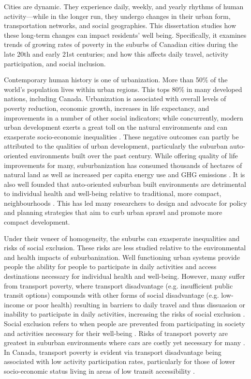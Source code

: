 
Cities are dynamic. They experience daily, weekly, and yearly rhythms of human activity---while in the longer run, they undergo changes in their urban form, transportation networks, and social geographies. This dissertation studies how these long-term changes can impact residents' well being. Specifically, it examines trends of growing rates of poverty in the suburbs of Canadian cities during the late 20th and early 21st centuries; and how this affects daily travel, activity participation, and social inclusion.


Contemporary human history is one of urbanization. More than 50\% of the world's population lives within urban regions. This tops 80\% in many developed nations, including Canada. Urbanization is associated with overall levels of poverty reduction, economic growth, increases in life expectancy, and improvements in a number of other social indicators; while concurrently, modern urban development exerts a great toll on the natural environments and can exasperate socio-economic inequalities \cite{whitmee_safeguarding_2015}. These negative outcomes can partly be attributed to the qualities of urban development, particularly the suburban auto-oriented environments built over the past century. While offering quality of life improvements for many, suburbanization has consumed thousands of hectares of natural land as well as increased per capita energy use and GHG emissions \cite{ewing_compactness_2015}. It is also well founded that auto-oriented suburban built environments are detrimental to individual health and well-being relative to traditional, more compact, neighbourhoods . This has led many researchers to design and advocate for policy and planning strategies that aim to curb urban sprawl and promote more compact development.


Under their veneer of homogeneity, the suburbs can exasperate inequalities and risks of social exclusion. These risks are less studied relative to the environmental and health impacts of suburbanization. Well functioning urban systems provide people the ability for people to participate in daily activities and access destinations necessary for individual health and well-being. However, many suffer from transport poverty, where transport disadvantage (e.g. insufficient public transit options) compounds with other forms of social disadvantage (e.g. low-income or poor health) resulting in barriers to daily travel and thus dissuasion or inability to participate in daily activities, increasing the risks of social exclusion \cite{lucas_transport_2012}. Social exclusion refers to when people are prevented from participating in society and activities necessary for their well-being \cite{levitas_multi-dimensional_2007}. Risks of transport poverty are greatest in suburban environments where cars are costly yet necessary for many \cite{allen_sizing_2019}. In Canada, transport poverty is evident via transport disadvantage being associated with low activity participation rates, particularly for those of lower socio-economic status living in areas of low transit accessibility . 


